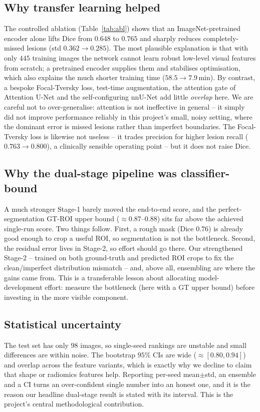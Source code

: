 \documentclass[11pt]{article}
\begin{document}
\subsection{Why transfer learning helped}
The controlled ablation (Table~\ref{tab:abl}) shows that an ImageNet-pretrained
encoder alone lifts Dice from $0.648$ to $0.765$ and sharply reduces
completely-missed lesions (std $0.362\to0.285$). The most plausible explanation is
that with only $445$ training images the network cannot learn robust low-level
visual features from scratch; a pretrained encoder supplies them and stabilises
optimisation, which also explains the much shorter training time
($58.5\to7.9$\,min). By contrast, a bespoke Focal-Tversky loss, test-time
augmentation, the attention gate of Attention U-Net and the self-configuring
nnU-Net add little \emph{overlap} here. We are careful not to over-generalise:
attention is not ineffective in general -- it simply did not improve performance
reliably in this project's small, noisy setting, where the dominant error is missed
lesions rather than imperfect boundaries. The Focal-Tversky loss is likewise not
useless -- it trades precision for higher lesion recall ($0.763\to0.800$), a
clinically sensible operating point -- but it does not raise Dice.

\subsection{Why the dual-stage pipeline was classifier-bound}
A much stronger Stage-1 barely moved the end-to-end score, and the
perfect-segmentation GT-ROI upper bound ($\approx 0.87$--$0.88$) sits far above the
achieved single-run score. Two things follow. First, a rough mask (Dice $0.76$) is
already good enough to crop a useful ROI, so segmentation is not the bottleneck.
Second, the residual error lives in Stage-2, so effort should go there. Our
strengthened Stage-2 -- trained on both ground-truth and predicted ROI crops to fix
the clean/imperfect distribution mismatch -- and, above all, ensembling are where
the gains came from. This is a transferable lesson about allocating
model-development effort: measure the bottleneck (here with a GT upper bound) before
investing in the more visible component.

\subsection{Statistical uncertainty}
The test set has only $98$ images, so single-seed rankings are unstable and small
differences are within noise. The bootstrap $95\%$ CIs are wide
($\approx[0.80,0.94]$) and overlap across the feature variants, which is exactly
why we decline to claim that shape or radiomics features help. Reporting per-seed
mean$\pm$std, an ensemble and a CI turns an over-confident single number into an
honest one, and it is the reason our headline dual-stage result is stated with its
interval. This is the project's central methodological contribution.
\end{document}
